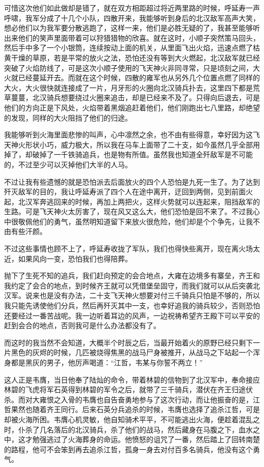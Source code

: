可惜这次他们如此做却是错了，就在双方相距超过将近两里路的时候，呼延寿一声呼啸，我军分成了十几个小队，四散开来，我能够听到身后的北汉敌军高声大笑，想必他们以为我军要分散逃跑了，这样一来，他们是必胜无疑的了，我甚至能够听出来他们的笑声里面带着可以狩猎猎物的欣喜。就在这时，小顺子突然策马回头，然后手中多了一个小银筒，连续按动上面的机关，从里面飞出火焰，迅速点燃了枯黄干燥的草原，若是平常的放火之法，恐怕还没有等到大火燃起，北汉敌军就已经突破了火焰防线了，可是这次小顺子使用的飞天神火非同寻常，只是顷刻之间，大火就已经蔓延开去。而就在这个时候，四散的雍军也从另外几个位置点燃了同样的大火，大火很快就连接成了一片，月牙形的火圈向北汉骑兵扑去，这里四下都是荒草蔓蔓，北汉骑兵想要绕过火圈来追击，却是已经来不及了。只得向后退去，可是他们的方向正是下风处，火焰带着黑烟追赶着他们，他们刚跑出七八里路，却绝望的发现，同样的大火阻挡了他们的归途。

我能够听到火海里面悲惨的叫声，心中凛然之余，也不由有些得意，幸好因为这飞天神火形状小巧，威力极大，所以我在马车上面带了二十支，如今虽然几乎全部用掉了，却破掉了一千铁骑追兵，也是物有所值。虽然我也知道全歼敌军是不可能的，不过至少可以灭掉他们大半的人马。

不过让我有些遗憾的就是恐怕派去后面放火的四个人恐怕是九死一生了。为了达到歼灭敌军的目的，我让呼延寿派了四个人在途中离开，迂回到两侧，见到前面火起，北汉军奔逃回来的时候，再加上两把火，这样火势就可以连起来，阻挡敌军的生路。可是飞天神火太厉害了，现在风又这么大，他们恐怕是回不来了。不过我心中很敬佩他们的勇气，虽然明知道留下来放火很危险，他们却是个个争先，让我不由有些汗颜。

不过这些事情也顾不上了，呼延寿收拢了军队，我们也得快些离开，现在离火场太近，如果风向一变，恐怕我们也得陪葬。

抛下了生死不知的追兵，我们赶向预定的会合地点，大雍在边境多有寨垒，齐王和我约定了会合的地点，到时候齐王就可以凭借堡垒固守，而我们就可以从后突袭北汉军。说来也是没有办法，二十支飞天神火想要对付三千骑兵只怕是不够的，所以我只能先诱使他们分兵，然后再歼灭其中一支，也幸好追我的骑兵较少，否则恐怕还要经过一番苦战呢。我一边听着耳边的风声，一边祝祷希望齐王殿下可以平安的赶到会合的地点，否则我可是什么办法都没有了。

而这时的我当然不会知道，大概半个时辰之后，当最开始着火的原野已经只剩下一片黑色的灰烬的时候，几匹被烧得焦黑的战马尸身被推开，从战马之下站起一个浑身都是黑灰的男子，他厉声喝道：“江哲，韦某与你誓不两立！”

这人正是韦膺，当日他奉了陆灿的命令，带着林碧的信物到了北汉军中，奉命接应林碧的飞虎将军石英得到林碧的军令之后，就带了三千骑兵，潜伏在齐王归途伏杀。而对大雍恨之入骨的韦膺也自告奋勇地参与了这次行动，而让他振奋的是，江哲果然也随着齐王同行。后来石英分兵追杀的时候，韦膺也选择了追杀江哲，可是却被火海所困。韦膺心机灵敏，他自知骑术平平，不可能逃出火海，便趁着混乱之时，仆杀了几名落后的北汉骑兵，杀了他们的战马，然后藏身在马腹之下，血水之中，这才勉强逃过了火海葬身的命运。他愤怒的诅咒了一番，然后踏上了回转南楚的路程，他可不会笨到再去追杀江哲，孤身一身去对付百多名骑兵，他没有这个勇气。

